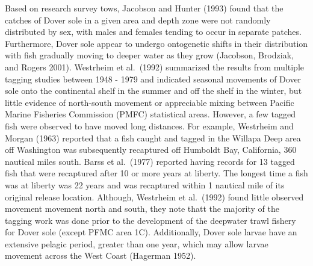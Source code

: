 \documentclass[11pt,
  english,
  a4paper,
]{article}
\begin{document}
Based on research survey tows, Jacobson and Hunter {(1993)\leavevmode\tagmcend\tagstructend} found that the catches of Dover sole in a given area and depth zone were not randomly distributed by sex, with males and females tending to occur in separate patches. Furthermore, Dover sole appear to undergo ontogenetic shifts in their distribution with fish gradually moving to deeper water as they grow {(Jacobson, Brodziak, and Rogers 2001)\leavevmode\tagmcend\tagstructend}. Westrheim et al.~{(1992)\leavevmode\tagmcend\tagstructend} summarized the results from multiple tagging studies between 1948 - 1979 and indicated seasonal movements of Dover sole onto the continental shelf in the summer and off the shelf in the winter, but little evidence of north-south movement or appreciable mixing between Pacific Marine Fisheries Commission (PMFC) statistical areas. However, a few tagged fish were observed to have moved long distances. For example, Westrheim and Morgan {(1963)\leavevmode\tagmcend\tagstructend} reported that a fish caught and tagged in the Willapa Deep area off Washington was subsequently recaptured off Humboldt Bay, California, 360 nautical miles south. Barss et al.~{(1977)\leavevmode\tagmcend\tagstructend} reported having records for 13 tagged fish that were recaptured after 10 or more years at liberty. The longest time a fish was at liberty was 22 years and was recaptured within 1 nautical mile of its original release location. Although, Westrheim et al.~{(1992)\leavevmode\tagmcend\tagstructend} found little observed movement movement north and south, they note thatt the majority of the tagging work was done prior to the development of the deepwater trawl fishery for Dover sole (except PFMC area 1C). Additionally, Dover sole larvae have an extensive pelagic period, greater than one year, which may allow larvae movement across the West Coast {(Hagerman 1952)\leavevmode\tagmcend\tagstructend}.

\leavevmode\tagmcend\tagstructend\par

\end{document}
